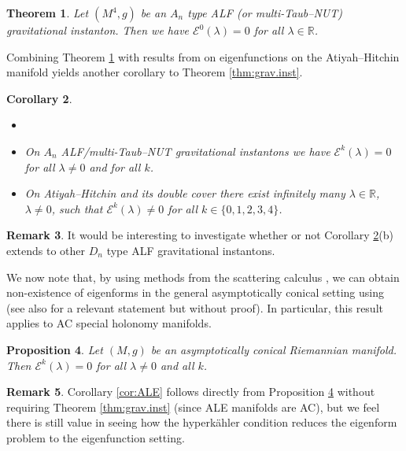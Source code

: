 \documentclass{article}
\newtheorem{thm}{Theorem}
\newtheorem{prop}[thm]{Proposition}
\newtheorem{cor}[thm]{Corollary}
\theoremstyle{definition}
\newtheorem{rmk}[thm]{Remark}
\numberwithin{thm}{section}
\numberwithin{equation}{section}
\def\R{\mathbb{R}}
\begin{document}
\begin{thm}\label{thm:An.ALF}
Let $(M^4,g)$ be an $A_n$ type ALF (or multi-Taub--NUT) gravitational instanton.  Then we have $\mathcal{E}^0(\lambda)=0$ for all $\lambda\in\R$.
\end{thm}

Combining Theorem \ref{thm:An.ALF} with results from \cite{Schroers3,GibbonsManton} on eigenfunctions on the Atiyah--Hitchin manifold yields another corollary to Theorem \ref{thm:grav.inst}.

\begin{cor}\label{cor:ALF}
\begin{itemize}\item[]
    \item[(a)] On $A_n$ ALF/multi-Taub--NUT gravitational instantons we have $\mathcal{E}^k(\lambda)=0$ for all $\lambda\neq 0$ and for all $k$.
    \item[(b)] On Atiyah--Hitchin and its double cover there exist infinitely many $\lambda\in \R$, $\lambda\neq 0$, such that $\mathcal{E}^k(\lambda)\neq 0$ for all $k\in\{0,1,2,3,4\}$.
\end{itemize}
\end{cor}


\begin{rmk}
    It would be interesting to investigate whether or not Corollary \ref{cor:ALF}(b) extends to other $D_n$ type ALF gravitational instantons.
\end{rmk}


We now note that, by using methods from the scattering calculus  \cite{Melrose}, we can obtain non-existence of eigenforms in the general asymptotically conical setting using \cite{CNTV} (see also \cite[p.~78]{Melrose} for a relevant statement but without proof).  In particular, this result applies to AC special holonomy manifolds.

\begin{prop}\label{prop:AC.Ek}
    Let $(M,g)$ be an asymptotically conical Riemannian manifold.  Then $\mathcal{E}^k(\lambda)=0$ for all $\lambda\neq 0$ and all $k$.
\end{prop}

\begin{rmk}
  Corollary \ref{cor:ALE} follows directly from Proposition \ref{prop:AC.Ek} without requiring Theorem \ref{thm:grav.inst} (since ALE manifolds are AC), but we feel there is still value in seeing how the hyperk\"ahler condition reduces the eigenform problem to the eigenfunction setting.      
\end{rmk}
\end{document}

